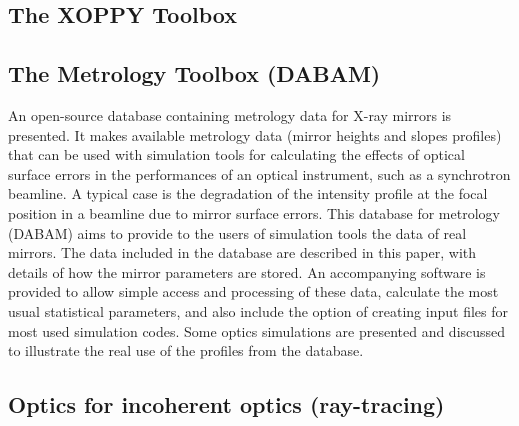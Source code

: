\documentclass{aip-cp}
\begin{document}
\subsection{The XOPPY Toolbox}

\subsection{The Metrology Toolbox (DABAM)}
An open-source database containing metrology data for X-ray mirrors is presented. It makes available metrology data (mirror heights and slopes profiles) that can be used with simulation tools for calculating the effects of optical surface errors in the performances of an optical instrument, such as a synchrotron beamline. A typical case is the degradation of the intensity profile at the focal position in a beamline due to mirror surface errors. This database for metrology (DABAM) aims to provide to the users of simulation tools the data of real mirrors. The data included in the database are described in this paper, with details of how the mirror parameters are stored. An accompanying software is provided to allow simple access and processing of these data, calculate the most usual statistical parameters, and also include the option of creating input files for most used simulation codes. Some optics simulations are presented and discussed to illustrate the real use of the profiles from the database.

\subsection{Optics for incoherent optics (ray-tracing)}
\end{document}
